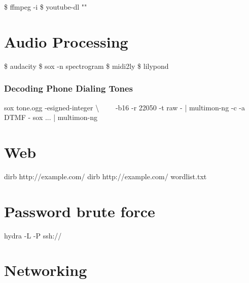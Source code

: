 \documentclass{refcard}
\begin{document}
\begin{ldesc}
	  \$ ffmpeg -i  
	 \$ youtube-dl ""
\end{ldesc}


\section{Audio Processing}

\begin{ldesc}
	   \$ audacity 
	\li[Spectrogram]                   \$ sox  -n spectrogram
	       \$ midi2ly 
	          \$ lilypond 
\end{ldesc}

\subsubsection{Decoding Phone Dialing Tones}

\begin{ldesc}
	   sox tone.ogg -esigned-integer \textbackslash \li
	                   ~~~~-b16 -r 22050 -t raw - | \li
	                   multimon-ng -c -a DTMF -
	 sox ... | multimon-ng
\end{ldesc}


\section{Web}

\begin{ldesc}
	       dirb http://example.com/
	 dirb http://example.com/ wordlist.txt
\end{ldesc}


\section{Password brute force}

\begin{ldesc}
	 hydra -L  -P  ssh://
\end{ldesc}


\pagebreak

\section{Networking}
\end{document}
